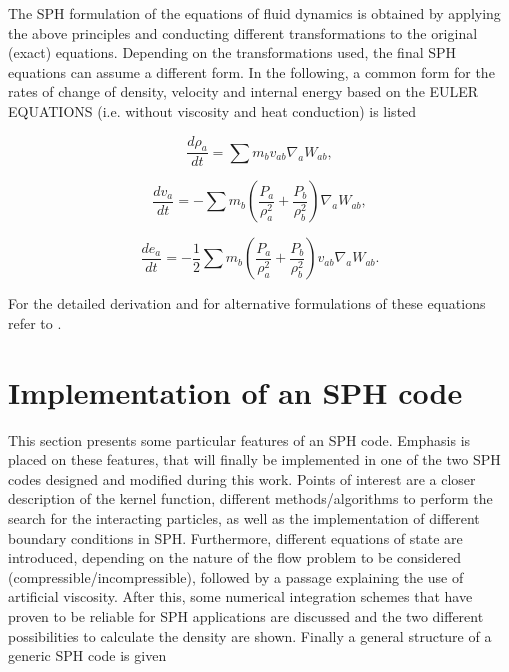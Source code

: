 \documentclass{report}
\begin{document}
The SPH formulation of the equations of fluid
dynamics is obtained by applying the above principles and conducting different
transformations to the original (exact) equations. Depending on the
transformations used, the final SPH equations can assume a different form. In
the following, a common form for the rates of change of density, velocity and
internal energy based on the EULER EQUATIONS (i.e. without viscosity and heat conduction)
is listed\cite{Monaghan2005,Liu2003} 

\begin{equation}
\label{eq:DCR_Euler}
\frac{d\rho _a}{\mathit{dt}}=\sum{m_{b}v_{\mathit{ab}}\nabla _{a}W_{\mathit{ab}}},
\end{equation}

\begin{equation}
\label{eq:VCR_Euler}
\frac{dv_{a}}{\mathit{dt}}=-\sum {m_{b}\left(\frac{P_{a}}{\rho_{a}^{2}}+\frac{P_{b}}{\rho _{b}^{2}}\right)\nabla_{a}W_{ab}},
\end{equation}


\begin{equation}
\label{eq:ECR_Euler}
\frac{de_{a}}{\mathit{dt}}=-\mathit{}\frac{1}{2}\sum{m_{b}\left(\frac{P_{a}}{\rho _{a}^{2}}+\frac{P_{b}}{\rho _{b}^{2}}\right)v_{\mathit{ab}}\nabla _{a}W_{\mathit{ab}}}.
\end{equation}

For the detailed derivation and for alternative formulations of
these equations refer to \cite{Monaghan2005, Liu2003}.



\section{Implementation of an SPH code}
This section presents some particular features of an SPH code. Emphasis is
placed on these features, that will finally be implemented in one of the
two SPH codes designed and modified during this work.
Points of interest are a closer description of the kernel function, different methods/algorithms to perform the search for the interacting particles, as well as the implementation of different boundary conditions in
SPH. Furthermore, different
equations of state are introduced, depending on the nature of the flow problem
to be considered (compressible/incompressible), followed by a passage
explaining the use of artificial viscosity. After this, some numerical
integration schemes that have proven to be reliable for SPH applications are discussed and the two different possibilities to calculate the density are shown. Finally a general structure of a generic SPH code is given
\end{document}
